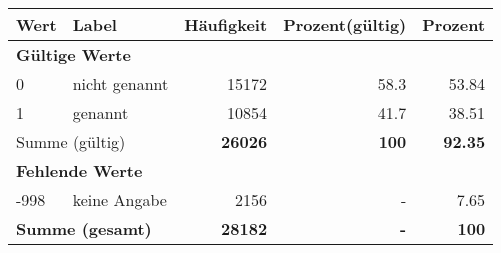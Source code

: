      \begin{longtable}{lXrrr}
     \toprule
     \textbf{Wert} & \textbf{Label} & \textbf{Häufigkeit} & \textbf{Prozent(gültig)} & \textbf{Prozent} \\
     \endhead
     \midrule
     \multicolumn{5}{l}{\textbf{Gültige Werte}}\\

     0 &
     \multicolumn{1}{X}{ nicht genannt   } &


       \num{15172} &
       \num[round-mode=places,round-precision=2]{58.3} &
         \num[round-mode=places,round-precision=2]{53.84} \\

     1 &
     \multicolumn{1}{X}{ genannt   } &


       \num{10854} &
       \num[round-mode=places,round-precision=2]{41.7} &
         \num[round-mode=places,round-precision=2]{38.51} \\
     \midrule
     \multicolumn{2}{l}{Summe (gültig)} &
       \textbf{\num{26026}} &
     \textbf{\num{100}} &
       \textbf{\num[round-mode=places,round-precision=2]{92.35}} \\
     \multicolumn{5}{l}{\textbf{Fehlende Werte}}\\
       -998 &
       keine Angabe &
         \num{2156} &
        - &
         \num[round-mode=places,round-precision=2]{7.65} \\
     \midrule
     \multicolumn{2}{l}{\textbf{Summe (gesamt)}} &
          \textbf{\num{28182}} &
        \textbf{-} &
        \textbf{\num{100}} \\
     \bottomrule
     \end{longtable}
     
